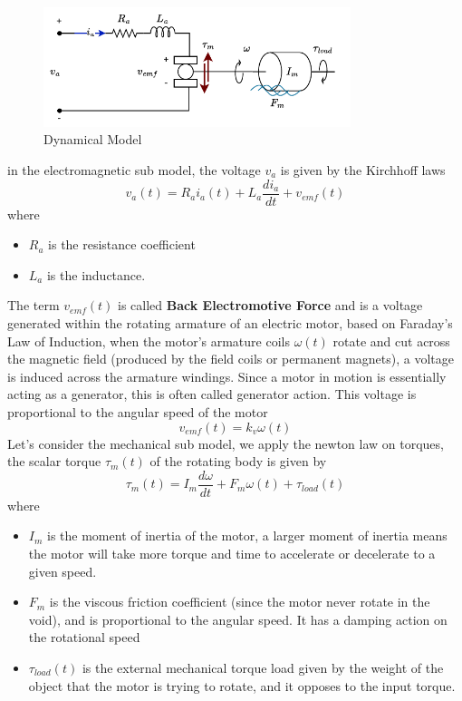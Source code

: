 \documentclass[10pt, letterpaper]{report}
\begin{document}
\begin{figure}[h!]
    \centering
    \includegraphics[width=0.8\textwidth ]{images/motor_scheme.drawio.pdf}
    \caption{Dynamical Model}
    \label{fig:model_motor}
\end{figure}

in the electromagnetic sub model, the voltage $v_a$ is given by the Kirchhoff laws\begin{equation}
    v_a(t)=R_ai_a(t)+L_a\frac{d i_a}{dt}+v_{emf}(t)
\end{equation}
where\begin{itemize}
    \item $R_a$ is the resistance coefficient 
    \item $L_a$ is the inductance. 
\end{itemize}
The term $v_{emf}(t)$ is called \textbf{Back Electromotive Force} and is a voltage generated within the rotating armature of an electric motor,  based on Faraday's Law of Induction, when the motor's armature coils $\omega(t)$ rotate and cut across the magnetic field (produced by the field coils or permanent magnets), a voltage is induced across the armature windings. Since a motor in motion is essentially acting as a generator, this is often called generator action. This voltage is proportional to the angular speed of the motor\begin{equation}\label{eq:model_balance_2}
    v_{emf}(t)=k_v\omega(t)
\end{equation}
Let's consider the mechanical sub model, we apply the newton law on torques, the scalar torque $\tau_m(t)$ of the rotating body is given by\begin{equation}
    \tau_m(t)=I_m\frac{d\omega}{dt}+F_m\omega(t)+\tau_{load}(t)
\end{equation}
where\begin{itemize}
    \item $I_m$ is the moment of inertia of the motor, a larger moment of inertia means the motor will take more torque and time to accelerate or decelerate to a given speed.
    \item $F_m$ is the viscous friction coefficient (since the motor never rotate in the void), and is proportional to the angular speed. It has a damping action on the rotational speed
    \item $\tau_{load}(t)$ is the external mechanical torque load given by the weight of the object that the motor is trying to rotate, and it opposes to the input torque.
\end{itemize}
\end{document}
